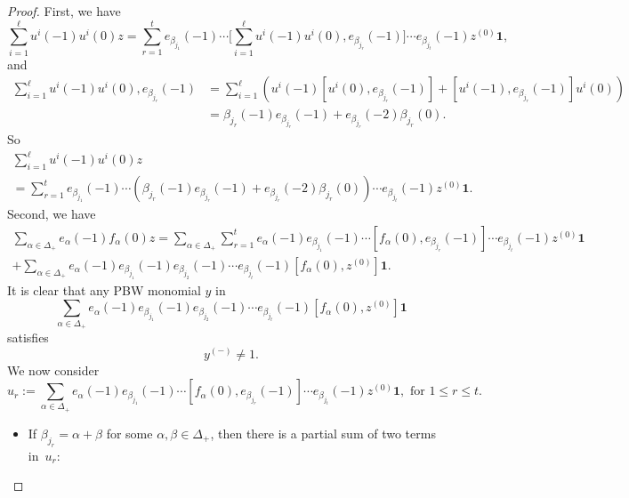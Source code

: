 \documentclass[11pt]{article}
\numberwithin{equation}{section}
\let\al\alpha
\let\be\beta
\theoremstyle{definition}
\begin{document}
\begin{proof}
First, we have\vspace*{-3pt}
\begin{equation*}
\sum_{i=1}^{\ell} u^i(-1)u^i(0) z
= \sum_{r=1}^t
e_{\be_{j_1}}(-1) \cdots \biggl[\sum_{i=1}^{\ell}u^i(-1)u^i(0), e_{\be_{j_r}}(-1)\biggr] \cdots e_{\be_{j_t}}(-1) z^{(0)} \mathbf{1},
\end{equation*}
and\vspace*{-3pt}
\begin{align*}
\sum_{i=1}^{\ell}u^i(-1)u^i(0), e_{\be_{j_r}}(-1)& = \sum_{i=1}^{\ell}\left(u^i(-1) [u^i(0), e_{\be_{j_r}}(-1)] + [u^i(-1), e_{\be_{j_r}}(-1)] u^i(0) \right)\\
& = \be_{j_r}(-1) e_{\be_{j_r}}(-1) + e_{\be_{j_r}}(-2) \be_{j_r}(0).
\end{align*}
So\vspace*{-5pt}
\begin{multline}\label{e37}
\sum_{i=1}^{\ell} u^i(-1)u^i(0) z\\[-8pt]
= \sum_{r=1}^t
e_{\be_{j_1}}(-1) \cdots (\be_{j_r}(-1) e_{\be_{j_r}}(-1) + e_{\be_{j_r}}(-2) \be_{j_r}(0)) \cdots e_{\be_{j_t}}(-1) z^{(0)} \mathbf{1}.
\end{multline}
Second, we have\vspace*{-5pt}
\begin{multline*}
\sum_{\al\in{\Delta}_+}e_{\al}(-1) f_{\al}(0) z
= \sum_{\al\in{\Delta}_+} \sum_{r=1}^te_{\al}(-1)
e_{\be_{j_1}}(-1) \cdots [f_{\al}(0),e_{\be_{j_r}}(-1)] \cdots e_{\be_{j_t}}(-1) z^{(0)} \mathbf{1} \\
+ \sum_{\al\in{\Delta}_+} e_{\al}(-1)e_{\be_{j_1}}(-1)e_{\be_{j_2}}(-1)\cdots e_{\be_{j_t}}(-1)
[f_{\al}(0),z^{(0)} ] \mathbf{1}.
\end{multline*}
It is clear that
any PBW monomial $y$ in\vspace*{-3pt}
\[
\sum_{\al\in{\Delta}_+}e_{\al}(-1) e_{\be_{j_1}}(-1)e_{\be_{j_2}}(-1)\cdots e_{\be_{j_t}}(-1)
[f_{\al}(0),z^{(0)} ] \mathbf{1}
\]
satisfies\vspace*{-3pt}
\begin{equation}\label{e38}
y^{(-)} \not= 1.
\end{equation}
We now consider
\[
u_r:=\sum_{\al\in{\Delta}_+}
e_{\al}(-1)e_{\be_{j_1}}(-1) \cdots [f_{\al}(0),e_{\be_{j_r}}(-1)] \cdots e_{\be_{j_t}}(-1) z^{(0)} \mathbf{1}, \text{ for } 1\leq r\leq t.
\]
\begin{itemize}
\item
If $\be_{j_r}=\al+\be$ for some $\al,\be\in\Delta_{+}$, then there is a partial sum of two terms in~$u_r$:

\end{itemize}
\end{proof}
\end{document}

